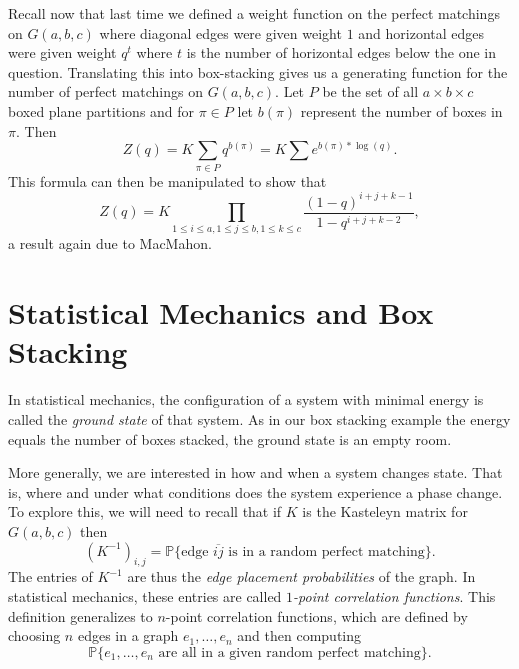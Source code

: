 \documentclass{article}
\begin{document}
Recall now that last time we defined a weight function on the perfect matchings on $G(a,b,c)$ where diagonal edges were given weight $1$ and horizontal edges were given weight $q^t$ where $t$ is the number of horizontal edges below the one in question. Translating this into box-stacking gives us a generating function for the number of perfect matchings on $G(a,b,c)$. Let $P$ be the set of all $a \times b \times c$ boxed plane partitions and for $\pi \in P$ let $b(\pi)$ represent the number of boxes in $\pi$. Then
$$
Z(q) = K \sum_{\pi \in P} q^{b(\pi)} = K\sum e^{b(\pi) * \log(q)}.
$$
This formula can then be manipulated to show that
$$
Z(q) = K \prod_{1 \leq i \leq a,  1 \leq j \leq b,  1 \leq k \leq c} \frac{(1-q)^{i+j+k-1}}{1-q^{i+j+k-2}},
$$
a result again due to MacMahon. 


\section{Statistical Mechanics and Box Stacking}

\hspace{1cm} In statistical mechanics, the configuration of a system with minimal energy is called the \textit{ground state} of that system. As in our box stacking example the energy equals the number of boxes stacked, the ground state is an empty room. 

More generally, we are interested in how and when a system changes state. That is, where and under what conditions does the system experience a phase change. To explore this, we will need to recall that if $K$ is the Kasteleyn matrix for $G(a,b,c)$ then
$$
(K^{-1})_{i,j} = \mathbb{P}\{\text{edge $\overline{ij}$ is in a random perfect matching} \}.
$$
The entries of $K^{-1}$ are thus the \textit{edge placement probabilities} of the graph. In statistical mechanics, these entries are called \textit{$1$-point correlation functions}. This definition generalizes to $n$-point correlation functions, which are defined by choosing $n$ edges in a graph $e_1, \dots, e_n$ and then computing
$$
\mathbb{P} \{e_1, \dots, e_n \text{ are all in a given random perfect matching}\}. 
$$
\end{document}
